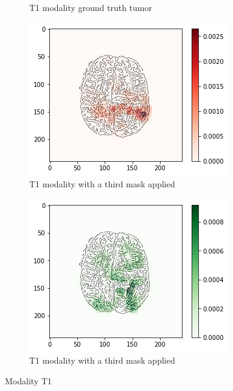 \begin{figure}[H]
\begin{subfigure}[t]{.21\textwidth}
        \caption{T1 modality ground truth tumor}
    \end{subfigure}
    \begin{subfigure}[t]{.27\textwidth}
        \centering
        \includegraphics[width=\linewidth]{chapters/06_hdm/b_Brats18_TCIA08_242_1_L2/23.png}
        \caption{T1 modality with a third mask applied}
    \end{subfigure}
    \begin{subfigure}[t]{.27\textwidth}
        \centering
        \includegraphics[width=\linewidth]{chapters/06_hdm/b_Brats18_TCIA08_242_1_L2/24.png}
        \caption{T1 modality with a third mask applied}
    \end{subfigure}
    \caption{Modality T1}
\end{figure}



